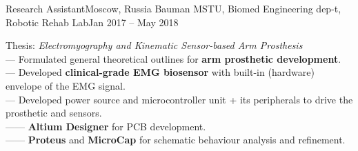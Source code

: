 \resumeSubheading
{Research Assistant}{Moscow, Russia}
{Bauman MSTU, Biomed Engineering dep-t, Robotic Rehab Lab}{Jan 2017 -- May 2018}
\begin{itemize}[leftmargin=0in, label={}]
    \small{\item{
        {Thesis: \textit{Electromyography and Kinematic Sensor-based Arm Prosthesis}}\\
        {— Formulated general theoretical outlines for \textbf{arm prosthetic development}.}\\
        {— Developed \textbf{clinical-grade EMG biosensor} with built-in (hardware) envelope of the EMG signal.}\\
        {— Developed power source and microcontroller unit + its peripherals to drive the prosthetic and sensors.}\\
        {—— \textbf{Altium Designer} for PCB development.}\\
        {—— \textbf{Proteus} and \textbf{MicroCap} for schematic behaviour analysis and refinement.}\\
    }}
\end{itemize}